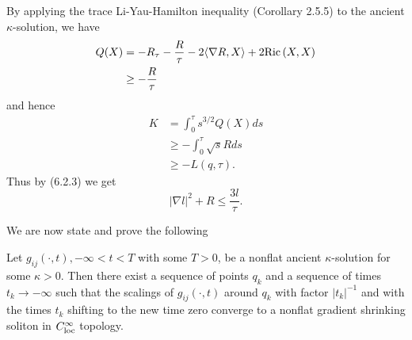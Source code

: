 By applying the trace Li-Yau-Hamilton inequality (Corollary 2.5.5)
to the ancient $\kappa$-solution, we have
\begin{align*}
Q(X)&  = -R_{\tau} -\frac{R}{\tau}-2 \langle\nabla
R,X\rangle+2{\rm Ric}\,(X,X) \\
&  \geq -\frac{R}{\tau}
\end{align*}
and hence
\begin{align*}
K&  = \int_0^{\tau}s^{3/2}Q(X)ds   \\
&  \geq -\int_0^{\tau}\sqrt{s}Rds \\
&  \geq -L(q,\tau).
\end{align*}
Thus by (6.2.3) we get \begin{equation} |\nabla l|^2+R\leq \frac{3l}{\tau}.
\end{equation} %

\medskip
We are now state and prove the following

\begin{theorem}
  \label{thm:cz-ancient-kappa-asymptotic-shrinker}

Let $g_{ij}(\cdot,t), -\infty<t<T$ with some $T>0$, be a nonflat
ancient $\kappa$-solution for some $\kappa >0$. Then there exist a
sequence of points $q_k$ and a sequence of times $t_k \rightarrow
-\infty$ such that the scalings of $g_{ij}(\cdot,t)$ around $q_k$
with factor $|t_k|^{-1}$ and with the times $t_k$ shifting to the
new time zero converge to a nonflat gradient shrinking soliton in
$C_{\rm loc}^\infty$ topology.
\end{theorem}

